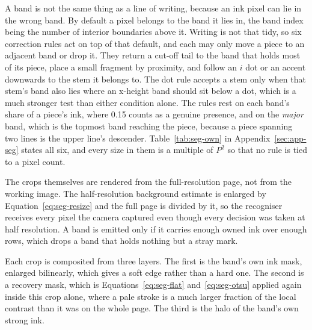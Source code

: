 A band is not the same thing as a line of writing, because an ink pixel can lie in the wrong band. By default a pixel belongs to the band it lies in, the band index being the number of interior boundaries above it. Writing is not that tidy, so six correction rules act on top of that default, and each may only move a piece to an adjacent band or drop it. They return a cut-off tail to the band that holds most of its piece, place a small fragment by proximity, and follow an $i$ dot or an accent downwards to the stem it belongs to. The dot rule accepts a stem only when that stem's band also lies where an x-height band should sit below a dot, which is a much stronger test than either condition alone. The rules rest on each band's share of a piece's ink, where 0.15 counts as a genuine presence, and on the \emph{major} band, which is the topmost band reaching the piece, because a piece spanning two lines is the upper line's descender. Table~\ref{tab:seg-own} in Appendix~\ref{sec:app-seg} states all six, and every size in them is a multiple of $P^2$ so that no rule is tied to a pixel count.

The crops themselves are rendered from the full-resolution page, not from the working image. The half-resolution background estimate is enlarged by Equation~\ref{eq:seg-resize} and the full page is divided by it, so the recogniser receives every pixel the camera captured even though every decision was taken at half resolution. A band is emitted only if it carries enough owned ink over enough rows, which drops a band that holds nothing but a stray mark.

Each crop is composited from three layers. The first is the band's own ink mask, enlarged bilinearly, which gives a soft edge rather than a hard one. The second is a recovery mask, which is Equations~\ref{eq:seg-flat} and~\ref{eq:seg-otsu} applied again inside this crop alone, where a pale stroke is a much larger fraction of the local contrast than it was on the whole page. The third is the halo of the band's own strong ink.

